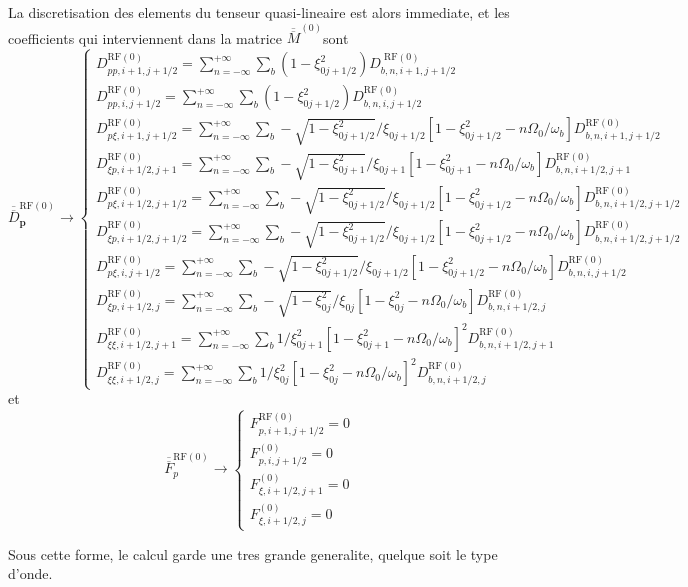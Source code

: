 La discretisation des elements du tenseur quasi-lineaire est alors
immediate, et les coefficients qui interviennent dans la matrice $\overline{\overline{M}}^{\left(0\right)}$sont
\[
\overline{\overline{D}}_{\mathbf{p}}^{\text{RF}(0)}\rightarrow\left\{ \begin{array}{l}
D_{pp,i+1,j+1/2}^{\text{RF}\left(0\right)}=\sum_{n=-\infty}^{+\infty}\sum_{b}(1-\xi_{0j+1/2}^{2})D_{b,n,i+1,j+1/2}^{\text{ RF}(0)}\\
D_{pp,i,j+1/2}^{\text{RF}\left(0\right)}=\sum_{n=-\infty}^{+\infty}\sum_{b}(1-\xi_{0j+1/2}^{2})D_{b,n,i,j+1/2}^{\text{RF}(0)}\\
D_{p\xi,i+1,j+1/2}^{\text{RF}\left(0\right)}=\sum_{n=-\infty}^{+\infty}\sum_{b}-\sqrt{1-\xi_{0j+1/2}^{2}}/\xi_{0j+1/2}\left[1-\xi_{0j+1/2}^{2}-n\Omega_{0}/\omega_{b}\right]D_{b,n,i+1,j+1/2}^{\text{RF}(0)}\\
D_{\xi p,i+1/2,j+1}^{\text{RF}\left(0\right)}=\sum_{n=-\infty}^{+\infty}\sum_{b}-\sqrt{1-\xi_{0j+1}^{2}}/\xi_{0j+1}\left[1-\xi_{0j+1}^{2}-n\Omega_{0}/\omega_{b}\right]D_{b,n,i+1/2,j+1}^{\text{RF}(0)}\\
D_{p\xi,i+1/2,j+1/2}^{\text{RF}\left(0\right)}=\sum_{n=-\infty}^{+\infty}\sum_{b}-\sqrt{1-\xi_{0j+1/2}^{2}}/\xi_{0j+1/2}\left[1-\xi_{0j+1/2}^{2}-n\Omega_{0}/\omega_{b}\right]D_{b,n,i+1/2,j+1/2}^{\text{RF}(0)}\\
D_{\xi p,i+1/2,j+1/2}^{\text{RF}\left(0\right)}=\sum_{n=-\infty}^{+\infty}\sum_{b}-\sqrt{1-\xi_{0j+1/2}^{2}}/\xi_{0j+1/2}\left[1-\xi_{0j+1/2}^{2}-n\Omega_{0}/\omega_{b}\right]D_{b,n,i+1/2,j+1/2}^{\text{RF}(0)}\\
D_{p\xi,i,j+1/2}^{\text{RF}\left(0\right)}=\sum_{n=-\infty}^{+\infty}\sum_{b}-\sqrt{1-\xi_{0j+1/2}^{2}}/\xi_{0j+1/2}\left[1-\xi_{0j+1/2}^{2}-n\Omega_{0}/\omega_{b}\right]D_{b,n,i,j+1/2}^{\text{RF}(0)}\\
D_{\xi p,i+1/2,j}^{\text{RF}\left(0\right)}=\sum_{n=-\infty}^{+\infty}\sum_{b}-\sqrt{1-\xi_{0j}^{2}}/\xi_{0j}\left[1-\xi_{0j}^{2}-n\Omega_{0}/\omega_{b}\right]D_{b,n,i+1/2,j}^{\text{RF}(0)}\\
D_{\xi\xi,i+1/2,j+1}^{\text{RF}\left(0\right)}=\sum_{n=-\infty}^{+\infty}\sum_{b}1/\xi_{0j+1}^{2}\left[1-\xi_{0j+1}^{2}-n\Omega_{0}/\omega_{b}\right]^{2}D_{b,n,i+1/2,j+1}^{\text{RF}(0)}\\
D_{\xi\xi,i+1/2,j}^{\text{RF}\left(0\right)}=\sum_{n=-\infty}^{+\infty}\sum_{b}1/\xi_{0j}^{2}\left[1-\xi_{0j}^{2}-n\Omega_{0}/\omega_{b}\right]^{2}D_{b,n,i+1/2,j}^{\text{RF}(0)}\end{array}\right.\]
 et \[
\overline{\overline{F}}_{p}^{\text{RF}(0)}\rightarrow\left\{ \begin{array}{l}
F_{p,i+1,j+1/2}^{\text{RF}(0)}=0\\
F_{p,i,j+1/2}^{\left(0\right)}=0\\
F_{\xi,i+1/2,j+1}^{\left(0\right)}=0\\
F_{\xi,i+1/2,j}^{\left(0\right)}=0\end{array}\right.\]


Sous cette forme, le calcul garde une tres grande generalite, quelque
soit le type d'onde.


